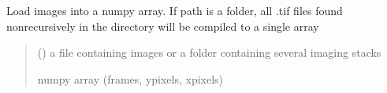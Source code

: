 \documentclass[letterpaper,10pt,english]{sphinxmanual}
\begin{document}
\begin{fulllineitems}
\label{\detokenize{CalSciPy.io_tools:CalSciPy.io_tools.load_images}}
\pysigstartsignatures
{}
\pysigstopsignatures
\sphinxAtStartPar
Load images into a numpy array. If path is a folder, all .tif files found non\sphinxhyphen{}recursively in the directory will be
compiled to a single array
\begin{quote}\begin{description}
\sphinxAtStartPar
{} () \textendash{} a file containing images or a folder containing several imaging stacks

\sphinxAtStartPar
numpy array (frames, y\sphinxhyphen{}pixels, x\sphinxhyphen{}pixels)

\sphinxAtStartPar
{}

\end{description}\end{quote}

\end{fulllineitems}

\end{document}
